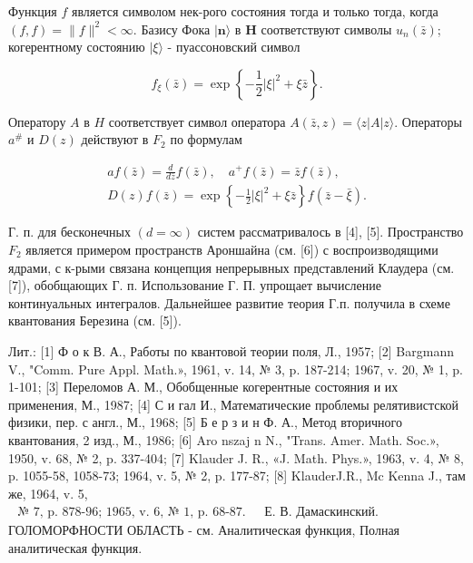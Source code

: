 \documentclass[10pt]{article}
\begin{document}
Функция $f$ является символом нек-рого состояния тогда и только тогда, когда $(f, f)=\|f\|^{2}<\infty$. Базису Фока $|\boldsymbol{n}\rangle$ в $\boldsymbol{H}$ соответствуют символы $u_{n}(\bar{z})$; когерентному состоянию $|\xi\rangle$ - пуассоновский символ



\[

f_{\xi}(\bar{z})=\exp \left\{-\frac{1}{2}|\xi|^{2}+\xi \bar{z}\right\} .

\]



Оператору $A$ в $H$ соответствует символ оператора $A(\bar{z}, z)=\langle z|A| z\rangle$. Операторы $a^{\#}$ и $D(z)$ действуют в $F_{2}$ по формулам



\[

\begin{gathered}

a f(\bar{z})=\frac{d}{d \bar{z}} f(\bar{z}), \quad a^{+} f(\bar{z})=\bar{z} f(\bar{z}), \\

D(z) f(\bar{z})=\exp \left\{-\frac{1}{2}|\xi|^{2}+\xi \bar{z}\right\} f(\bar{z}-\bar{\xi}) .

\end{gathered}

\]



Г. п. для бесконечных $(d=\infty)$ систем рассматривалось в [4], [5]. Пространство $F_{2}$ является примером пространств Ароншайна (см. [6]) с воспроизводящими ядрами, с к-рыми связана концепция непрерывных представлений Клаудера (см. [7]), обобщающих Г. п. Использование Г. П. упрощает вычисление континуальных интегралов. Дальнейшее развитие теория Г.п. получила в схеме квантования Березина (см. [5]).



Лит.: [1] Ф о к В. А., Работы по квантовой теории поля, Л., 1957; [2] Bargmann V., "Comm. Pure Appl. Math.», 1961, v. 14, № 3, p. 187-214; 1967, v. 20, № 1, p. 1-101; [3] Переломов А. М., Обобщенные когерентные состояния и их применения, М., 1987; [4] С и гал И., Математические проблемы релятивистской физики, пер. с англ., М., 1968; [5] Б е р з и н Ф. А., Метод вторичного квантования, 2 изд., М., 1986; [6] Aro nszaj n N., "Trans. Amer. Math. Soc.», 1950, v. 68, № 2, p. 337-404; [7] Klauder J. R., «J. Math. Phys.», 1963, v. 4, № 8, p. 1055-58, 1058-73; 1964, v. 5, № 2, p. 177-87; [8] KlauderJ.R., Mc Kenna J., там же, 1964, v. 5, $\begin{array}{ll}\text { № 7, p. 878-96; 1965, v. 6, № 1, p. 68-87. } & \text { Е. В. Дамаскинский. }\end{array}$ ГОЛОМОРФНОСТИ ОБЛАСТЬ - см. Аналитическая функция, Полная аналитическая функция.
\end{document}
